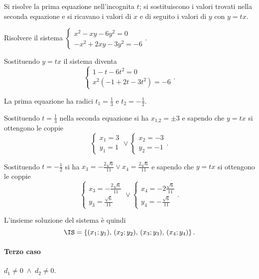 Si risolve la prima equazione nell'incognita $t$; si sostituiscono i valori trovati nella seconda equazione e si ricavano i valori di $x$ e di seguito i valori di $y$ con $y=tx$.
\pagebreak
\begin{exrig}
\begin{esempio}
Risolvere il sistema $\left\{\begin{array}{l}x^2-{xy}-6y^2=0 \\-x^2+2{xy}-3y^2=-6 \end{array}\right.$.

Sostituendo $y=tx$ il sistema diventa 
\[\left\{\begin{array}{l}1-t-6t^2=0 \\x^2(-1+2t-3t^2)=-6 \end{array}\right..\]

La prima equazione ha radici $t_1=\frac 1 3$ e $t_2=-\frac 1 2$.

Sostituendo $t=\frac 1 3$ nella seconda equazione si ha $x_{1\text{,}2}=\pm 3$ e sapendo che $y=tx$ si ottengono le coppie 
\[\left\{\begin{array}{l}x_1=3\\y_1=1\end{array}\right.\vee\left\{\begin{array}{l}x_2=-3\\y_2=-1\end{array}\right..\]

Sostituendo $t=-\frac 1 2$ si ha $x_3=-\frac{2\sqrt 6}{11}\vee x_4=\frac{2\sqrt 6}{11}$ e sapendo che $y={tx}$ si ottengono le coppie 
\[\left\{\begin{array}{l}x_3=-\frac{2\sqrt 6}{11}\\y_3=\frac{\sqrt 6}{11}\end{array}\right.\vee\left\{\begin{array}{l}x_4=-2\frac{\sqrt 6}{11}\\y_4=-\frac{\sqrt 6}{11}\end{array}\right..\]

L'insieme soluzione del sistema è quindi
\[\IS=\left\{(x_1;y_1)\text{, }(x_2;y_2)\text{, }(x_3;y_3)\text{, }(x_4;y_4)\right\}.\]
\end{esempio}
\end{exrig}

\paragraph{Terzo caso} $d_1\neq 0 \;\wedge\; d_2\neq 0$.

